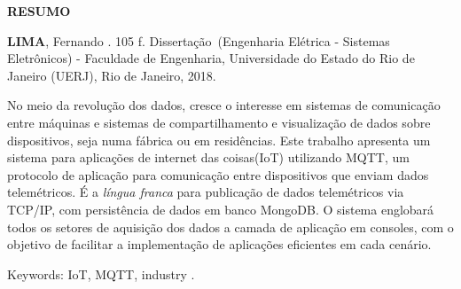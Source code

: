 \begin{center}
\textbf{RESUMO}
\end{center}

%
%

$\!$\\

\hspace{-1.3cm}\textbf{LIMA}, Fernando \textit{\setTitulo}. 105 f. Dissertação~(Engenharia Elétrica - Sistemas Eletrônicos) - Faculdade de Engenharia, Universidade do Estado do Rio de Janeiro (UERJ), Rio de Janeiro, 2018.

\vspace{.2cm}

No meio da revolução dos dados, cresce o interesse em sistemas de comunicação entre máquinas e sistemas de compartilhamento e visualização de dados  sobre dispositivos, seja numa fábrica ou em residências. Este trabalho apresenta um sistema para aplicações de internet das coisas(IoT) utilizando MQTT, um protocolo de aplicação para comunicação entre dispositivos que enviam dados telemétricos. É  a \textit{língua franca} para publicação de dados telemétricos via TCP/IP, com persistência de dados em banco MongoDB. O sistema englobará todos os setores de aquisição dos dados a camada de aplicação em consoles, com o objetivo de facilitar a implementação de aplicações eficientes em cada cenário.

\vspace{1cm}

\hspace{-1.3cm}Keywords: IoT, MQTT, industry .